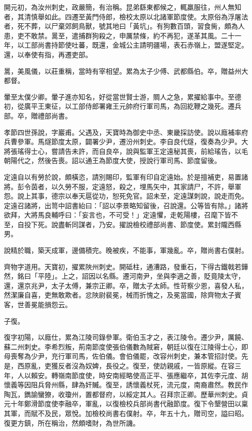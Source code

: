 \begin{pinyinscope}
 開元初，為汝州刺史，政嚴簡，有治稱。昆弟繇東都候之，輒羸服往，州人無知者，其清慎舉如此。四遷至黃門侍郎，檢校太原以北諸軍節度使。太原俗為浮屠法者，死不葬，以尸棄郊飼鳥獸，號其地曰「黃坑」。有狗數百頭，習食胔，頗為人患，吏不敢禁。暠至，遣捕群狗殺之，申厲禁條，約不再犯，遂革其風。二十一年，以工部尚書持節使吐蕃，既還，金城公主請明疆場，表石赤嶺上，盟遂堅定。還，以奉使有指，再遷吏部。



 暠，美風儀，以莊重稱，當時有宰相望。累為太子少傅、武都縣伯。卒，贈益州大都督。



 暈至太僕少卿。暈子進亦知名，好從當世賢士游，賙人之急，累擢給事中。至德初，從廣平王東征，以工部侍郎署雍王元帥府行軍司馬，為回紇鞭之幾死。遷兵部。卒，贈禮部尚書。



 孝節四世孫說，字巖甫。父遇及，天寶時為御史中丞、東畿採訪使。說以廕補率府兵曹參軍。馬燧節度太原，闢署少尹，遷汾州刺史。李自良代燧，復奏為少尹。大將張瑤得士心，嘗請告未許，而自良卒，說與監軍王定遠秘其喪，前給瑤告，以毛朝陽代之，然後告喪。詔以通王為節度大使，授說行軍司馬、節度留後。



 定遠自以有勞於說，頗橫恣，請別賜印，監軍有印自定遠始。於是擅補吏，易置諸將。彭令茵者，以久勞不服，定遠怒，殺之，埋馬矢中，其家請尸，不許，舉軍怨。說上其事，德宗以奉天扈從功，恕死免官。詔未至，定遠謀刺說，說走而免。定遠召諸將，出笥中詔書紿曰：「詔以李景略知留後，召說還。公等皆有除。」諸將欲拜，大將馬良輔呼曰：「妄言也，不可受！」定遠懼，走乾陽樓，召麾下皆不至，自投下死。說盡斬同謀者，乃安。擢說檢校禮部尚書、節度使。累封隴西縣男。



 說精於職，築天成軍，邊備積完。晚被疾，不能事，軍幾亂。卒，贈尚書右僕射。



 齊物字道用。天寶初，擢累陜州刺史。開砥柱，通漕路，發重石，下得古鐵戟若鏵然，銘曰「平陸」。上之，詔因以名縣。遷河南尹，坐與李適之善，貶竟陵太守，還，還京兆尹，太子太傅，兼宗正卿。卒，贈太子太師。性苛察少恩，喜發人私，然潔廉自喜，吏無敢欺者。忿陜尉裴冕，械而折愧之，及冕當國，除齊物太子賓客，世善冕能損怨云。



 子復。



 復字初陽，以廕仕，累為江陵司錄參軍。衛伯玉才之，表江陵令。遷少尹，厲饒、蘇二州刺史。李希烈叛，荊南節度使張伯儀數為賊窘，朝廷以復在江陵得士心，即母喪奪為少尹，充行軍司馬，佐伯儀。會伯儀罷，改容州刺史，兼本管招討使。先是，西原亂，吏獲反者沒為奴婢，長役之。復至，使訪親戚，一皆原縱。在容三年，人以賴安。轉嶺南節度使，時安南經略使高正平、張應繼卒，其佐李元度、胡懷義等因阻兵脅州縣，肆為奸贓。復至，誘懷義杖死，流元度，南裔肅然。教民作陶瓦，鐫諭蠻獠，收瓊州，置都督府，以綏定其人。召拜宗正卿。歷華州刺史。貞元十年鄭滑節度使李融卒，軍亂，以復檢校兵部尚書代融節度。復下令墾營田以稟其軍，而賦不及民，眾悅。加檢校尚書右僕射。卒，年五十九，贈司空，謚曰昭。復更方鎮，所在稱治，然頗嗜財，為世所譏。




\end{pinyinscope}

